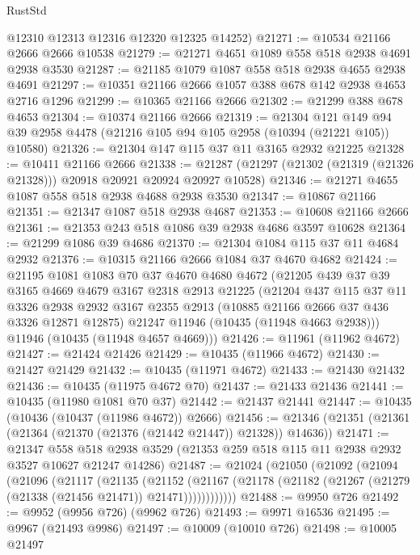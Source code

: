 \begin{lexlean}{RustStd}
\begin{coremodule}
      @12310
      @12313
      @12316
      @12320
      @12325
      @14252)
@21271 := @10534 @21166 @2666 @2666 @10538
@21279 := @21271 @4651 @1089 @558 @518 @2938 @4691 @2938 @3530
@21287 := @21185 @1079 @1087 @558 @518 @2938 @4655 @2938 @4691
@21297 := @10351 @21166 @2666 @1057 @388 @678 @142 @2938 @4653 @2716 @1296
@21299 := @10365 @21166 @2666
@21302 := @21299 @388 @678 @4653
@21304 := @10374 @21166 @2666
@21319 := @21304
    @121
    @149
    @94
    @39
    @2958
    @4478
    (@21216 @105 @94 @105 @2958 (@10394 (@21221 @105)) @10580)
@21326 := @21304 @147 @115 @37 @11 @3165 @2932 @21225
@21328 := @10411 @21166 @2666
@21338 := @21287 (@21297 (@21302 (@21319 (@21326 @21328))) @20918 @20921 @20924 @20927 @10528)
@21346 := @21271 @4655 @1087 @558 @518 @2938 @4688 @2938 @3530
@21347 := @10867 @21166
@21351 := @21347 @1087 @518 @2938 @4687
@21353 := @10608 @21166 @2666
@21361 := @21353 @243 @518 @1086 @39 @2938 @4686 @3597 @10628
@21364 := @21299 @1086 @39 @4686
@21370 := @21304 @1084 @115 @37 @11 @4684 @2932
@21376 := @10315 @21166 @2666 @1084 @37 @4670 @4682
@21424 := @21195
    @1081
    @1083
    @70
    @37
    @4670
    @4680
    @4672
    (@21205
      @439
      @37
      @39
      @3165
      @4669
      @4679
      @3167
      @2318
      @2913
      @21225
      (@21204
        @437
        @115
        @37
        @11
        @3326
        @2938
        @2932
        @3167
        @2355
        @2913
        (@10885 @21166 @2666 @37 @436 @3326 @12871 @12875)
        @21247
        @11946
        (@10435 (@11948 @4663 @2938)))
      @11946
      (@10435 (@11948 @4657 @4669)))
@21426 := @11961 (@11962 @4672)
@21427 := @21424 @21426
@21429 := @10435 (@11966 @4672)
@21430 := @21427 @21429
@21432 := @10435 (@11971 @4672)
@21433 := @21430 @21432
@21436 := @10435 (@11975 @4672 @70)
@21437 := @21433 @21436
@21441 := @10435 (@11980 @1081 @70 @37)
@21442 := @21437 @21441
@21447 := @10435 (@10436 (@10437 (@11986 @4672)) @2666)
@21456 := @21346 (@21351 (@21361 (@21364 (@21370 (@21376 (@21442 @21447)) @21328)) @14636))
@21471 := @21347
    @558
    @518
    @2938
    @3529
    (@21353 @259 @518 @115 @11 @2938 @2932 @3527 @10627 @21247 @14286)
@21487 := @21024
    (@21050
      (@21092
        (@21094
          (@21096
            (@21117
              (@21135
                (@21152
                  (@21167
                    (@21178 (@21182 (@21267 (@21279 (@21338 (@21456 @21471)) @21471))))))))))))
@21488 := @9950 @726
@21492 := @9952 (@9956 @726) (@9962 @726)
@21493 := @9971 @16536
@21495 := @9967 (@21493 @9986)
@21497 := @10009 (@10010 @726)
@21498 := @10005 @21497

\end{coremodule}
\end{lexlean}
